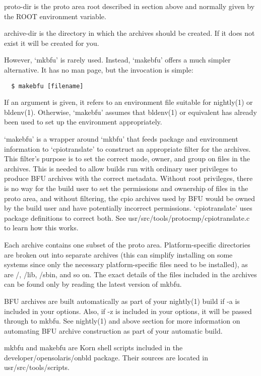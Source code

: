 \documentclass{article}
\begin{document}
proto-dir is the proto area root described in section above and normally given
by the ROOT environment variable.

archive-dir is the directory in which the archives should be created. If it
does not exist it will be created for you.

However, `mkbfu' is rarely used. Instead, `makebfu' offers a much simpler
alternative. It has no man page, but the invocation is simple:

\begin{verbatim}
  $ makebfu [filename]
\end{verbatim}

If an argument is given, it refers to an environment file suitable for
nightly(1) or bldenv(1). Otherwise, `makebfu' assumes that bldenv(1) or
equivalent has already been used to set up the environment appropriately.

`makebfu' is a wrapper around `mkbfu' that feeds package and environment
information to `cpiotranslate' to construct an appropriate filter for the
archives. This filter's purpose is to set the correct mode, owner, and group on
files in the archives. This is needed to allow builds run with ordinary user
privileges to produce BFU archives with the correct metadata. Without root
privileges, there is no way for the build user to set the permissions and
ownership of files in the proto area, and without filtering, the cpio archives
used by BFU would be owned by the build user and have potentially incorrect
permissions. `cpiotranslate' uses package definitions to correct both. See
usr/src/tools/protocmp/cpiotranslate.c to learn how this works.

Each archive contains one subset of the proto area. Platform-specific
directories are broken out into separate archives (this can simplify installing
on some systems since only the necessary platform-specific files need to be
installed), as are /, /lib, /sbin, and so on. The exact details of the files
included in the archives can be found only by reading the latest version of
mkbfu.

BFU archives are built automatically as part of your nightly(1) build if -a is
included in your options. Also, if -z is included in your options, it will be
passed through to mkbfu. See nightly(1) and above section for more information on
automating BFU archive construction as part of your automatic build.

mkbfu and makebfu are Korn shell scripts included in the \\
developer/opensolaris/onbld package. Their sources are located in \\
usr/src/tools/scripts.
\end{document}
